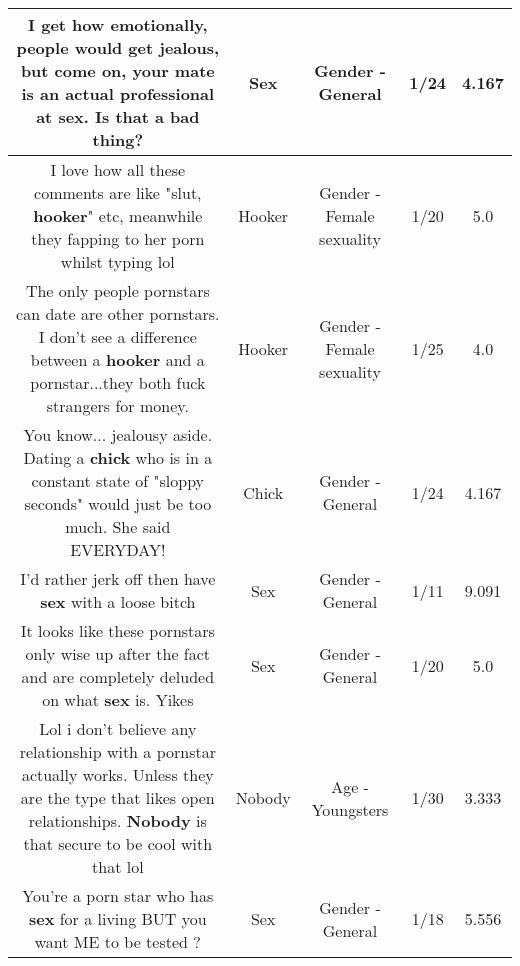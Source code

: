 \documentclass[11pt]{article}
\newlength\mylength
\begin{document}
\begin{center}
\begin{longtable}{|C{.65\mylength}|C{.30\mylength}|C{.12\mylength}|C{.12\mylength}|C{.12\mylength}|}
  \small I get how emotionally, people would get jealous, but come on, your mate is an actual professional at \textbf{sex}.  Is that a bad thing?\normalsize   & Sex & Gender - General & 1/24 & 4.167 \\  \hline
  \small I love how all these comments are like "slut, \textbf{hooker}" etc, meanwhile they fapping to her porn whilst typing lol\normalsize   & Hooker & Gender - Female sexuality & 1/20 & 5.0 \\  \hline
  \small The only people pornstars can date are other pornstars. I don't see a difference  between a \textbf{hooker} and a pornstar...they both fuck strangers for money.\normalsize   & Hooker & Gender - Female sexuality & 1/25 & 4.0 \\  \hline
  \small You know... jealousy aside. Dating a \textbf{chick} who is in a constant state of "sloppy seconds"  would just be too much. She said EVERYDAY!\normalsize   & Chick & Gender - General & 1/24 & 4.167 \\  \hline
  \small I'd rather jerk off then have \textbf{sex} with a loose bitch\normalsize   & Sex & Gender - General & 1/11 & 9.091 \\  \hline
  \small It looks like these pornstars only wise up after the fact and are completely deluded on what \textbf{sex} is. Yikes\normalsize   & Sex & Gender - General & 1/20 & 5.0 \\  \hline
  \small Lol i don't believe any relationship with a pornstar actually works. Unless they are the type that likes open relationships. \textbf{Nobody} is that secure to be cool with that lol\normalsize   & Nobody & Age - Youngsters & 1/30 & 3.333 \\  \hline
  \small You're a porn star who has \textbf{sex} for a living BUT you want ME to be tested ?\normalsize   & Sex & Gender - General & 1/18 & 5.556 \\  \hline

\end{longtable}
\end{center}
\end{document}
